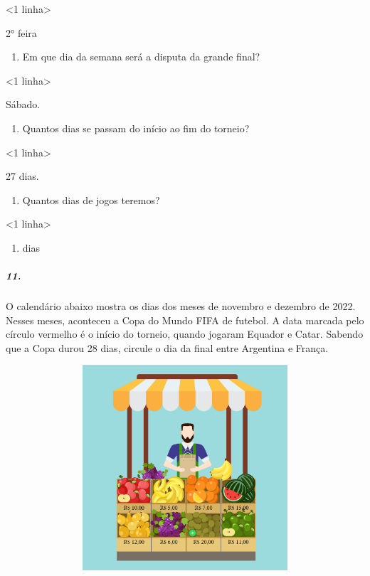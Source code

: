 \textless{}1 linha\textgreater{}

2° feira

\begin{enumerate}
\def\labelenumi{\alph{enumi})}
\item
  Em que dia da semana será a disputa da grande final?
\end{enumerate}

\textless{}1 linha\textgreater{}

Sábado.

\begin{enumerate}
\def\labelenumi{\alph{enumi})}
\item
  Quantos dias se passam do início ao fim do torneio?
\end{enumerate}

\textless{}1 linha\textgreater{}

27 dias.

\begin{enumerate}
\def\labelenumi{\alph{enumi})}
\item
  Quantos dias de jogos teremos?
\end{enumerate}

\textless{}1 linha\textgreater{}

\begin{enumerate}
\def\labelenumi{\arabic{enumi}.}
\setcounter{enumi}{6}
\item
  dias
\end{enumerate}

\subparagraph{11.}\label{section-52}

O calendário abaixo mostra os dias dos meses de novembro e dezembro de
2022. Nesses meses, aconteceu a Copa do Mundo FIFA de futebol. A data
marcada pelo círculo vermelho é o início do torneio, quando jogaram
Equador e Catar. Sabendo que a Copa durou 28 dias, circule o dia da
final entre Argentina e França.

\includegraphics[width=6.01042in,height=3.00521in]{media/image65.png}


